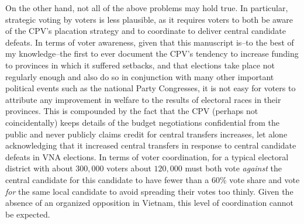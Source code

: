\documentclass[12pt]{article}
\newcommand{\1}{\mathbbm{1}}
\begin{document}
On the other hand, not all of the above problems may hold true. In particular, strategic voting by voters is less plausible, as it requires voters to both be aware of the CPV's placation strategy and to coordinate to deliver central candidate defeats. In terms of voter awareness, given that this manuscript is--to the best of my knowledge--the first to ever document the CPV's tendency to increase funding to provinces in which it suffered setbacks, and that elections take place not regularly enough and also do so in conjunction with many other important political events such as the national Party Congresses, it is not easy for voters to attribute any improvement in welfare to the results of electoral races in their provinces. This is compounded by the fact that the CPV (perhaps not coincidentally) keeps details of the budget negotiations confidential from the public and never publicly claims credit for central transfers increases, let alone acknowledging that it increased central transfers in response to central candidate defeats in VNA elections. In terms of voter coordination, for a typical electoral district with about $300,000$ voters about $120,000$ must both vote \textit{against} the central candidate for this candidate to have fewer than a 60\% vote share and vote \textit{for} the same local candidate to avoid spreading their votes too thinly. Given the absence of an organized opposition in Vietnam, this level of coordination cannot be expected.
\end{document}
